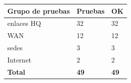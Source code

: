 \begingroup\small
\begin{longtable}{@{}p{5cm}p{3cm}p{3cm}@{}}
\toprule
\textbf{Grupo de pruebas} & \textbf{Pruebas} & \textbf{OK}\\
\midrule
\endhead
enlaces HQ & 32 & 32\\
WAN & 12 & 12\\
sedes & 3 & 3\\
Internet & 2 & 2\\
\textbf{Total} & \textbf{49} & \textbf{49}\\
\bottomrule
\end{longtable}
\endgroup
